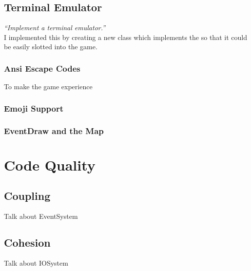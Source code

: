 \documentclass{article}
\begin{document}
\begin{multicols}{2}
                \subsection{Terminal Emulator}
                \textit{``Implement a terminal emulator.''} \\


                I implemented this by creating a new class  which implements the  so that it could be easily slotted into the game. 

                    \subsubsection{Ansi Escape Codes}

                        To make the game experience 

                    \subsubsection{Emoji Support}


                    \subsubsection{EventDraw and the Map}


        \section{Code Quality}

            \subsection{Coupling}
                Talk about EventSystem

            \subsection{Cohesion}
                Talk about IOSystem


\end{multicols}
\end{document}
